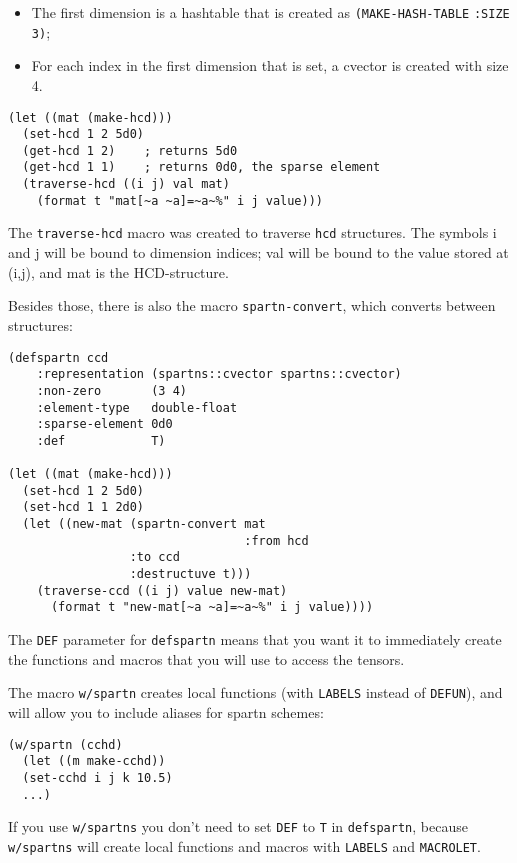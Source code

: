 \documentclass{article}
\begin{document}
\begin{itemize}
\item The first dimension is a hashtable that is created as \verb+(MAKE-HASH-TABLE+ 
      \verb+:SIZE 3)+;
\item For each index in the first dimension that is set, a cvector is created with size 4.
\end{itemize}

\begin{lstlisting}
(let ((mat (make-hcd)))
  (set-hcd 1 2 5d0)
  (get-hcd 1 2)    ; returns 5d0
  (get-hcd 1 1)    ; returns 0d0, the sparse element
  (traverse-hcd ((i j) val mat)
    (format t "mat[~a ~a]=~a~%" i j value)))
\end{lstlisting}

The \verb+traverse-hcd+ macro was created to traverse \verb+hcd+ structures. The symbols i and j
will be bound to dimension indices; val will be bound to the value stored at (i,j), and mat
is the HCD-structure.

Besides those, there is also the macro \verb+spartn-convert+, which converts between structures:

\begin{lstlisting}
(defspartn ccd
    :representation (spartns::cvector spartns::cvector)
    :non-zero       (3 4)
    :element-type   double-float
    :sparse-element 0d0
    :def            T)

(let ((mat (make-hcd)))
  (set-hcd 1 2 5d0)
  (set-hcd 1 1 2d0)
  (let ((new-mat (spartn-convert mat
                                 :from hcd
				 :to ccd
				 :destructuve t)))
    (traverse-ccd ((i j) value new-mat)
      (format t "new-mat[~a ~a]=~a~%" i j value))))
\end{lstlisting}

The \verb+DEF+ parameter for \verb+defspartn+ means that you want it to immediately create the functions
and macros that you will use to access the tensors.

The macro \verb+w/spartn+ creates local
functions (with \verb+LABELS+ instead of \verb+DEFUN+), and will allow you to include aliases
for spartn schemes:

\begin{lstlisting}
(w/spartn (cchd)
  (let ((m make-cchd))
  (set-cchd i j k 10.5)
  ...)
\end{lstlisting}

If you use \verb+w/spartns+ you don't need to set \verb+DEF+ to \verb+T+ in \verb+defspartn+,
because \verb+w/spartns+ will create local functions and macros with \verb+LABELS+ and \verb+MACROLET+.
\end{document}
